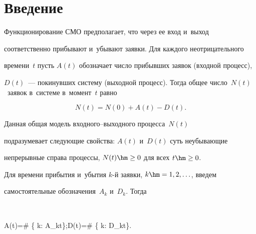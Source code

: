       












 \thispagestyle{headings}


 


 \vspace*{-12pt}





\section{Введение}





\vspace*{-4pt}








     Функционирование СМО предполагает, что через ее вход и~выход 


соответственно прибывают и~убывают заявки. Для каждого неотрицательного 


времени~$t$ пусть $A(t)$ обозначает чис\-ло прибывших заявок (входной процесс), 


$D(t)$~--- покинувших сис\-те\-му (выходной процесс). Тогда общее чис\-ло~$N(t)$~заявок в~сис\-те\-ме в~момент~$t$ равно


     $$


     N(t)=N(0)+A(t)-D(t).


     $$


Данная общая модель вход\-но\-го--вы\-ход\-но\-го процесса~$N(t)$ 


подразумевает сле\-ду\-ющие свойства: $A(t)$ и~$D(t)$ суть неубывающие 


непрерывные справа процессы, $N(t)\hm\geq 0$ для всех $t\hm\geq 0$. 


     


     Для времени прибытия и~убытия $k$-й заявки, $k\hm=1,2,\ldots$, введем 


самостоятельные обозначения~$A_k$ и~$D_k$. Тогда 


     $$ 


     A(t)=\# \left\{ k: A_k\leq t\right\};\quad D(t)=\# \left\{ k: D_k\leq t\right\}.


